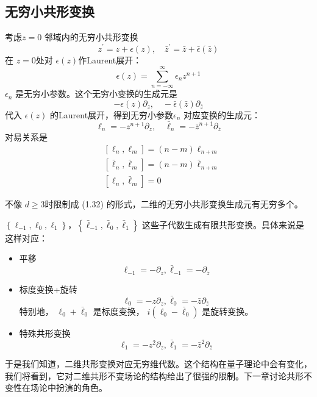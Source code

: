 \subsection{无穷小共形变换}
考虑$ z=0$ 邻域内的无穷小共形变换
\begin{equation}
		z^{\prime}=z+\epsilon(z), \quad \bar{z}^{\prime}=\bar{z}+\bar{\epsilon}(\bar{z})
\end{equation}
在 $z=0 $处对 $\epsilon(z) $作Laurent展开：
\begin{equation}
	\epsilon(z)=\sum_{n=-\infty}^{\infty} \epsilon_{n} z^{n+1}
\end{equation}
$\epsilon_n$ 是无穷小参数。这个无穷小变换的生成元是
\begin{equation}
	-\epsilon(z) \partial_{z}, \quad-\bar{\epsilon}(\bar{z}) \partial_{\bar{z}}
\end{equation}
代入 $\epsilon(z)$ 的Laurent展开，得到无穷小参数$ \epsilon_n$ 对应变换的生成元：
\begin{equation}
	\ell_{n}=-z^{n+1} \partial_{z}, \quad \bar{\ell}_{n}=-\bar{z}^{n+1} \partial_{\bar{z}}
\end{equation}
对易关系是
\begin{align} &\left[\ell_{n}, \ell_{m}\right]=(n-m) \ell_{n+m} \\ &\left[\bar{\ell}_{n}, \bar{\ell}_{m}\right]=(n-m) \bar{\ell}_{n+m} \\ &\left[\ell_{n}, \bar{\ell}_{m}\right]=0  \end{align}

不像 $d\geq 3 $时限制成 (1.32) 的形式，二维的无穷小共形变换生成元有无穷多个。

$\left\{\ell_{-1}, \ell_{0}, \ell_{1}\right\} ， \left\{\bar{\ell}_{-1}, \bar{\ell}_{0}, \bar{\ell}_{1}\right\}$ 这些子代数生成有限共形变换。具体来说是这样对应：
\begin{itemize}
	\item 平移
	\[\ell_{-1}=-\partial_{z}, \bar{\ell}_{-1}=-\partial_{\bar{z}}\]
	\item{标度变换+旋转}
	\[\ell_{0}=-z \partial_{z}, \bar{\ell}_{0}=-\bar{z} \partial_{\bar{z}}\]
	特别地， $\ell_{0}+\bar{\ell}_{0}$ 是标度变换， $i\left(\ell_{0}-\bar{\ell}_{0}\right)$ 是旋转变换。
	\item 特殊共形变换
	\[\ell_{1}=-z^{2} \partial_{z}, \bar{\ell}_{1}=-\bar{z}^{2} \partial_{\bar{z}}
	\]
\end{itemize}

于是我们知道，二维共形变换对应无穷维代数。这个结构在量子理论中会有变化，我们将看到，它对二维共形不变场论的结构给出了很强的限制。下一章讨论共形不变性在场论中扮演的角色。


